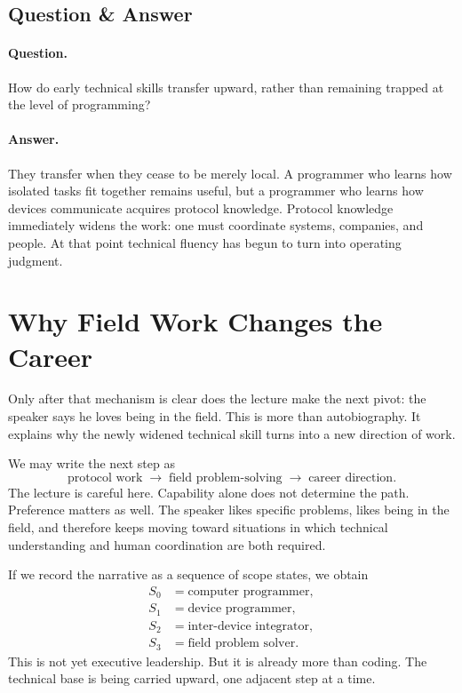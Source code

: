 \subsection{Question \& Answer}

\paragraph{Question.}
How do early technical skills transfer upward, rather than remaining trapped at the level of programming?

\paragraph{Answer.}
They transfer when they cease to be merely local. A programmer who learns how isolated tasks fit together remains useful, but a programmer who learns how devices communicate acquires protocol knowledge. Protocol knowledge immediately widens the work: one must coordinate systems, companies, and people. At that point technical fluency has begun to turn into operating judgment.

\section{Why Field Work Changes the Career}

Only after that mechanism is clear does the lecture make the next pivot: the speaker says he loves being in the field. This is more than autobiography. It explains why the newly widened technical skill turns into a new direction of work.

We may write the next step as
\begin{equation}
\text{protocol work}
\;\to\;
\text{field problem-solving}
\;\to\;
\text{career direction}.
\end{equation}
The lecture is careful here. Capability alone does not determine the path. Preference matters as well. The speaker likes specific problems, likes being in the field, and therefore keeps moving toward situations in which technical understanding and human coordination are both required.

If we record the narrative as a sequence of scope states, we obtain
\begin{align}
S_0 &= \text{computer programmer}, \\
S_1 &= \text{device programmer}, \\
S_2 &= \text{inter-device integrator}, \\
S_3 &= \text{field problem solver}.
\end{align}
This is not yet executive leadership. But it is already more than coding. The technical base is being carried upward, one adjacent step at a time.

